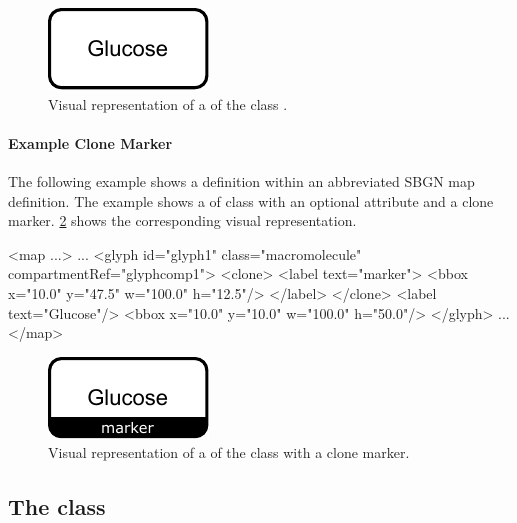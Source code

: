 \begin{figure}[!ht]
  \centering
  \includegraphics[scale=0.9]{figures/glyph_example.pdf}
\caption{Visual representation of a \Glyph of the class .}
  \label{fig:glyph_example}
\end{figure}

\paragraph{Example Clone Marker}

The following example shows a \Glyph definition within an abbreviated SBGN map definition. The example shows a \Glyph of class  with an optional attribute  and a clone marker. \ref{fig:glyph_clone_example} shows the corresponding visual representation.

\begin{example}
<map ...>
    ...
    <glyph id="glyph1" class="macromolecule" compartmentRef="glyphcomp1">
        <clone>
            <label text="marker">
                <bbox x="10.0" y="47.5" w="100.0" h="12.5"/>
            </label>
        </clone>
        <label text="Glucose"/>
        <bbox x="10.0" y="10.0" w="100.0" h="50.0"/>
    </glyph>
    ...
</map>
\end{example}

\begin{figure}[!ht]
  \centering
  \includegraphics[scale=0.9]{figures/glyph_clone_example.pdf}
\caption{Visual representation of a \Glyph of the class  with a clone marker.}
  \label{fig:glyph_clone_example}
\end{figure}



\subsection{The  class}
\label{port-class}

